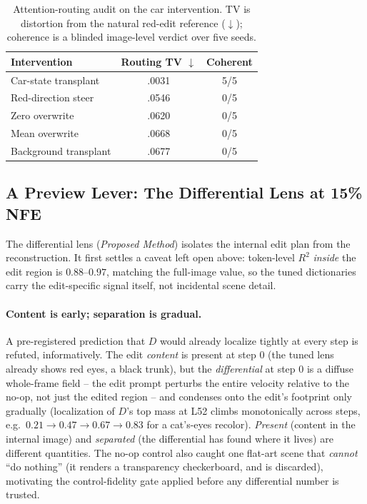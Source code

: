 \documentclass[letterpaper]{article} %
\begin{document}
\begin{table}[t]
\caption{Attention-routing audit on the car intervention. TV is distortion
from the natural red-edit reference ($\downarrow$); coherence is a blinded
image-level verdict over five seeds.}
\label{tab:routing}
\centering
\footnotesize
\setlength{\tabcolsep}{4pt}
\begin{tabular}{@{}lcc@{}}
\toprule
Intervention & Routing TV $\downarrow$ & Coherent \\
\midrule
Car-state transplant & .0031 & 5/5 \\
Red-direction steer & .0546 & 0/5 \\
Zero overwrite & .0620 & 0/5 \\
Mean overwrite & .0668 & 0/5 \\
Background transplant & .0677 & 0/5 \\
\bottomrule
\end{tabular}
\end{table}

\subsection{A Preview Lever: The Differential Lens at 15\% NFE}\label{sec:difflens}

The differential lens (\emph{Proposed Method}) isolates the internal
edit plan from the reconstruction. It first settles a caveat left open
above: token-level $R^2$ \emph{inside} the edit region is
$0.88$--$0.97$, matching the full-image value, so the tuned
dictionaries carry the edit-specific signal itself, not incidental
scene detail.

\paragraph{Content is early; separation is gradual.} A pre-registered
prediction that $D$ would already localize tightly at every step is
refuted, informatively. The edit \emph{content} is present at step 0 (the
tuned lens already shows red eyes, a black trunk), but the
\emph{differential} at step 0 is a diffuse whole-frame field -- the edit
prompt perturbs the entire velocity relative to the no-op, not just the
edited region -- and condenses onto the edit's footprint only gradually
(localization of $D$'s top mass at L52 climbs monotonically across steps,
e.g.\ $0.21{\to}0.47{\to}0.67{\to}0.83$ for a cat's-eyes recolor).
\emph{Present} (content in the internal image) and \emph{separated}
(the differential has found where it lives) are different quantities.
The no-op control also caught one flat-art scene that \emph{cannot}
``do nothing'' (it renders a transparency checkerboard, and is
discarded), motivating the control-fidelity gate applied before any
differential number is trusted.
\end{document}
